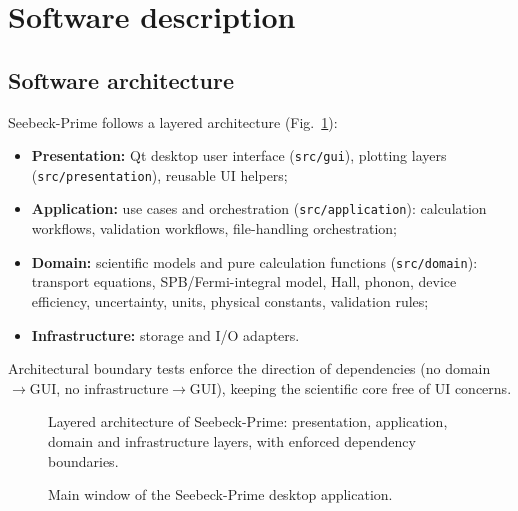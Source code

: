 \documentclass[preprint,12pt, a4paper]{elsarticle}
\begin{document}

\section{Software description}
\label{sec:software}

\subsection{Software architecture}
\label{sec:architecture}

Seebeck-Prime follows a layered architecture
(Fig.~\ref{fig:architecture}):

\begin{itemize}
  \item \textbf{Presentation:} Qt desktop user interface (\texttt{src/gui}),
        plotting layers (\texttt{src/presentation}), reusable UI helpers;
  \item \textbf{Application:} use cases and orchestration
        (\texttt{src/application}): calculation workflows, validation
        workflows, file-handling orchestration;
  \item \textbf{Domain:} scientific models and pure calculation functions
        (\texttt{src/domain}): transport equations, SPB/Fermi-integral model,
        Hall, phonon, device efficiency, uncertainty, units, physical
        constants, validation rules;
  \item \textbf{Infrastructure:} storage and I/O adapters.
\end{itemize}

Architectural boundary tests enforce the direction of dependencies (no
domain$\to$GUI, no infrastructure$\to$GUI), keeping the scientific core free
of UI concerns.

\begin{figure}[htbp]
\centering
{}
\caption{Layered architecture of Seebeck-Prime: presentation, application,
domain and infrastructure layers, with enforced dependency boundaries.}
\label{fig:architecture}
\end{figure}

\begin{figure}[htbp]
\centering
{}
\caption{Main window of the Seebeck-Prime desktop application.}
\label{fig:gui}
\end{figure}
\end{document}
